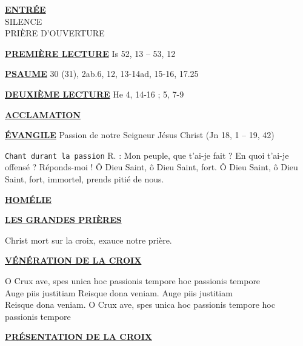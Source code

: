 \documentclass[11pt,a4paper]{article}
\newcommand{\SepRule}{\noindent							 %
						\begin{center}
							\rule{250pt}{1pt}
						\end{center}
						}
\newcommand{\NewsItem}[1]{%
\vspace{3pt}
\underline{\textbf{#1}}
		  }
\begin{document}





\begin{center}
\NewsItem{ENTRÉE} \\
SILENCE\\
PRIÈRE D'OUVERTURE
\end{center}

\NewsItem{PREMIÈRE LECTURE} Is 52, 13 – 53, 12

\begin{framed}
\NewsItem{PSAUME} 30 (31), 2ab.6, 12, 13-14ad, 15-16, 17.25

\end{framed}

\NewsItem{DEUXIÈME LECTURE} He 4, 14-16 ; 5, 7-9

\NewsItem{ACCLAMATION}
	
\begin{framed}
\NewsItem{ÉVANGILE} Passion de notre Seigneur Jésus Christ (Jn 18, 1 – 19, 42)

\texttt{Chant durant la passion}  R. : Mon peuple, que t'ai-je fait ? En quoi
t'ai-je offensé ? Réponds-moi ! Ô Dieu Saint, ô Dieu Saint, fort.
Ô Dieu Saint, ô Dieu Saint, fort, immortel, prends pitié de nous.
\end{framed}
\NewsItem{HOMÉLIE}

\NewsItem{LES GRANDES PRIÈRES}

Christ mort sur la croix, exauce notre prière.

\NewsItem{VÉNÉRATION DE LA CROIX} 
\begin{framed}
O Crux ave, spes unica hoc passionis tempore hoc passionis tempore\\
Auge piis justitiam Reisque dona veniam. Auge piis justitiam\\
Reisque dona veniam. O Crux ave, spes unica hoc passionis tempore hoc
passionis tempore
\end{framed}

\NewsItem{PRÉSENTATION DE LA CROIX} 
\end{document}
